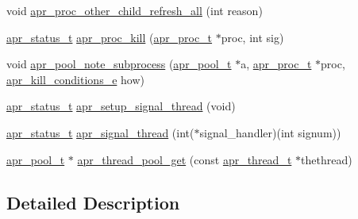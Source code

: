 \begin{DoxyCompactItemize}
\item 
void \hyperlink{group__apr__thread__proc_gacff5e867a92619d30c4e78f9ad2a58e3}{apr\-\_\-proc\-\_\-other\-\_\-child\-\_\-refresh\-\_\-all} (int reason)
\item 
\hyperlink{group__apr__errno_gaf76ee4543247e9fb3f3546203e590a6c}{apr\-\_\-status\-\_\-t} \hyperlink{group__apr__thread__proc_ga4a5ff2fce2c68460281b0cb3ee0365d5}{apr\-\_\-proc\-\_\-kill} (\hyperlink{structapr__proc__t}{apr\-\_\-proc\-\_\-t} $\ast$proc, int sig)
\item 
void \hyperlink{group__apr__thread__proc_gacbe3fd9491fa35149de28cebcae22f87}{apr\-\_\-pool\-\_\-note\-\_\-subprocess} (\hyperlink{group__apr__pools_gaf137f28edcf9a086cd6bc36c20d7cdfb}{apr\-\_\-pool\-\_\-t} $\ast$a, \hyperlink{structapr__proc__t}{apr\-\_\-proc\-\_\-t} $\ast$proc, \hyperlink{group__apr__thread__proc_ga3eaec78633742e7e0cb9480a21477aff}{apr\-\_\-kill\-\_\-conditions\-\_\-e} how)
\item 
\hyperlink{group__apr__errno_gaf76ee4543247e9fb3f3546203e590a6c}{apr\-\_\-status\-\_\-t} \hyperlink{group__apr__thread__proc_ga7adc09cd24568666266edce81cfffbed}{apr\-\_\-setup\-\_\-signal\-\_\-thread} (void)
\item 
\hyperlink{group__apr__errno_gaf76ee4543247e9fb3f3546203e590a6c}{apr\-\_\-status\-\_\-t} \hyperlink{group__apr__thread__proc_ga2e53fa76ff725749c7affe6c81faa9e5}{apr\-\_\-signal\-\_\-thread} (int($\ast$signal\-\_\-handler)(int signum))
\item 
\hyperlink{group__apr__pools_gaf137f28edcf9a086cd6bc36c20d7cdfb}{apr\-\_\-pool\-\_\-t} $\ast$ \hyperlink{group__apr__thread__proc_ga089b70ae9d6c64d2675a1fd1e9cd0d0d}{apr\-\_\-thread\-\_\-pool\-\_\-get} (const \hyperlink{group__apr__thread__proc_ga646c71351e723d84f8cc8c8d1d5937be}{apr\-\_\-thread\-\_\-t} $\ast$thethread)
\end{DoxyCompactItemize}


\subsection{Detailed Description}


